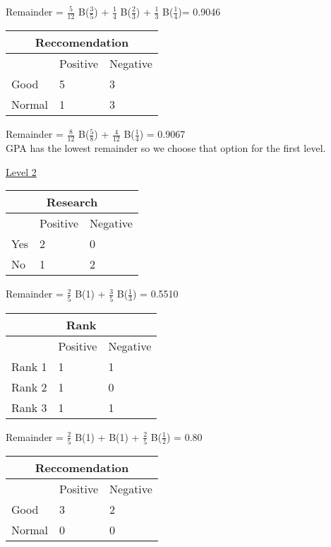 Remainder = $\frac{5}{12}$ B($\frac{3}{5}$) + $\frac{1}{4}$ B($\frac{2}{3}$)  + $\frac{1}{3}$ B($\frac{1}{4}$)= 0.9046\\

\begin{tabular}{ |p{3cm}||p{3cm}|p{3cm}| }
 \hline
 \multicolumn{3}{|c|}{Reccomendation} \\
 \hline
 & Positive & Negative\\
 \hline
 Good & 5 & 3\\
 Normal &   1 & 3\\
 \hline
\end{tabular}

Remainder = $\frac{8}{12}$ B($\frac{5}{8}$) + $\frac{4}{12}$ B($\frac{1}{4}$) = 0.9067\\

GPA has the lowest remainder so we choose that option for the first level.

\underline{Level 2}

\begin{tabular}{ |p{3cm}||p{3cm}|p{3cm}| }
 \hline
 \multicolumn{3}{|c|}{Research} \\
 \hline
 & Positive & Negative\\
 \hline
 Yes & 2 & 0\\
 No &   1 & 2\\
 \hline
\end{tabular}

Remainder = $\frac{2}{5}$ B(1) + $\frac{3}{5}$ B($\frac{1}{3}$) = 0.5510\\

\begin{tabular}{ |p{3cm}||p{3cm}|p{3cm}| }
 \hline
 \multicolumn{3}{|c|}{Rank} \\
 \hline
 & Positive & Negative\\
 \hline
 Rank 1 & 1 & 1\\
 Rank 2 &   1 & 0\\
 Rank 3 &   1 & 1\\
 \hline
\end{tabular}

Remainder = $\frac{2}{5}$ B(1) +  B(1) + $\frac{2}{5}$ B($\frac{1}{2}$) = 0.80\\

\begin{tabular}{ |p{3cm}||p{3cm}|p{3cm}| }
 \hline
 \multicolumn{3}{|c|}{Reccomendation} \\
 \hline
 & Positive & Negative\\
 \hline
 Good & 3 & 2\\
 Normal &   0 & 0\\
 \hline
\end{tabular}

